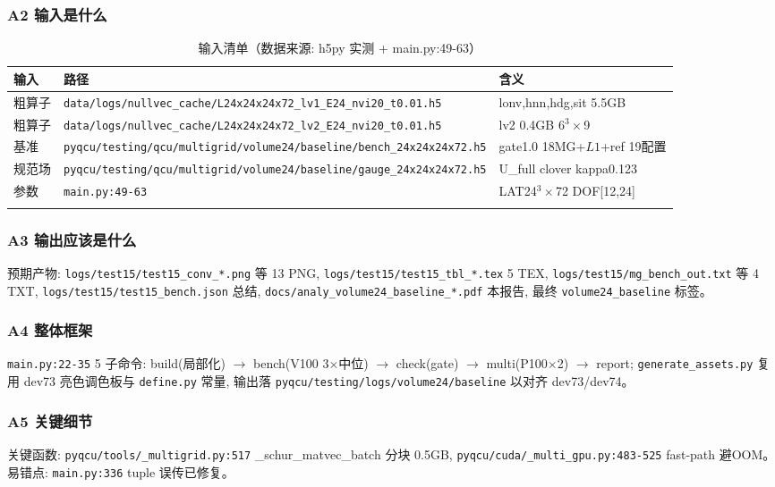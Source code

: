 \documentclass[UTF8]{ctexart}
\begin{document}
\subsubsection{A2 输入是什么}
\begin{xltabular}{\textwidth}{lXl}
\toprule
输入 & 路径 & 含义 \\
\midrule
\endhead
粗算子 & \texttt{\nolinkurl{data/logs/nullvec_cache/L24x24x24x72_lv1_E24_nvi20_t0.01.h5}} & lonv,hnn,hdg,sit 5.5GB \\
粗算子 & \texttt{\nolinkurl{data/logs/nullvec_cache/L24x24x24x72_lv2_E24_nvi20_t0.01.h5}} & lv2 0.4GB 6$^3\times$9 \\
基准 & \texttt{\nolinkurl{pyqcu/testing/qcu/multigrid/volume24/baseline/bench_24x24x24x72.h5}} & gate1.0 18MG+$L1$+ref 19配置 \\
规范场 & \texttt{\nolinkurl{pyqcu/testing/qcu/multigrid/volume24/baseline/gauge_24x24x24x72.h5}} & U\_full clover kappa0.123 \\
参数 & \texttt{\nolinkurl{main.py:49-63}} & LAT24$^3\times$72 DOF[12,24] \\
\bottomrule
\caption{输入清单（数据来源: h5py 实测 + main.py:49-63）}
\end{xltabular}

\subsubsection{A3 输出应该是什么}
预期产物: \texttt{\nolinkurl{logs/test15/test15_conv_*.png}} 等 13 PNG, \texttt{\nolinkurl{logs/test15/test15_tbl_*.tex}} 5 TEX, \texttt{\nolinkurl{logs/test15/mg_bench_out.txt}} 等 4 TXT, \texttt{\nolinkurl{logs/test15/test15_bench.json}} 总结, \texttt{\nolinkurl{docs/analy_volume24_baseline_*.pdf}} 本报告, 最终 \texttt{\nolinkurl{volume24_baseline}} 标签。

\subsubsection{A4 整体框架}
\texttt{\nolinkurl{main.py:22-35}} 5 子命令: build(局部化) $\to$ bench(V100 3$\times$中位) $\to$ check(gate) $\to$ multi(P100$\times$2) $\to$ report; \texttt{\nolinkurl{generate_assets.py}} 复用 dev73 亮色调色板与 \texttt{\nolinkurl{define.py}} 常量, 输出落 \texttt{\nolinkurl{pyqcu/testing/logs/volume24/baseline}} 以对齐 dev73/dev74。

\subsubsection{A5 关键细节}
关键函数: \texttt{\nolinkurl{pyqcu/tools/_multigrid.py:517}} \_schur\_matvec\_batch 分块 0.5GB, \texttt{\nolinkurl{pyqcu/cuda/_multi_gpu.py:483-525}} fast-path 避OOM。易错点: \texttt{\nolinkurl{main.py:336}} tuple 误传已修复。

\end{document}
